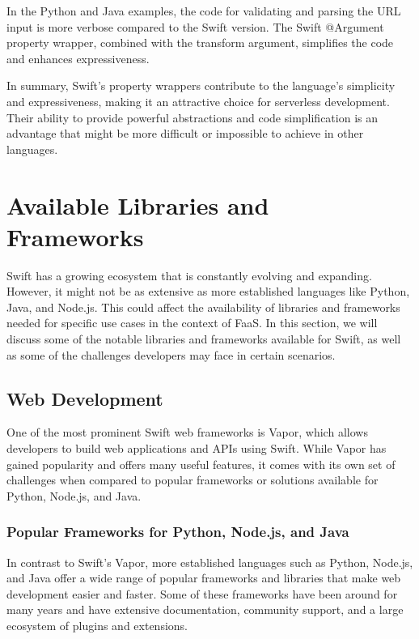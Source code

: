 In the Python and Java examples, the code for validating and parsing the URL input is more verbose compared to the Swift version. The Swift @Argument property wrapper, combined with the transform argument, simplifies the code and enhances expressiveness.

In summary, Swift’s property wrappers contribute to the language’s simplicity and expressiveness, making it an attractive choice for serverless development. Their ability to provide powerful abstractions and code simplification is an advantage that might be more difficult or impossible to achieve in other languages.

\section{Available Libraries and Frameworks}

Swift has a growing ecosystem that is constantly evolving and expanding. However, it might not be as extensive as more established languages like Python, Java, and Node.js. This could affect the availability of libraries and frameworks needed for specific use cases in the context of FaaS. In this section, we will discuss some of the notable libraries and frameworks available for Swift, as well as some of the challenges developers may face in certain scenarios. ~\cite{wsbox_chromiumos}

\subsection{Web Development}

One of the most prominent Swift web frameworks is Vapor, which allows developers to build web applications and APIs using Swift. While Vapor has gained popularity and offers many useful features, it comes with its own set of challenges when compared to popular frameworks or solutions available for Python, Node.js, and Java.

\subsubsection{Popular Frameworks for Python, Node.js, and Java}

In contrast to Swift's Vapor, more established languages such as Python, Node.js, and Java offer a wide range of popular frameworks and libraries that make web development easier and faster. Some of these frameworks have been around for many years and have extensive documentation, community support, and a large ecosystem of plugins and extensions.


